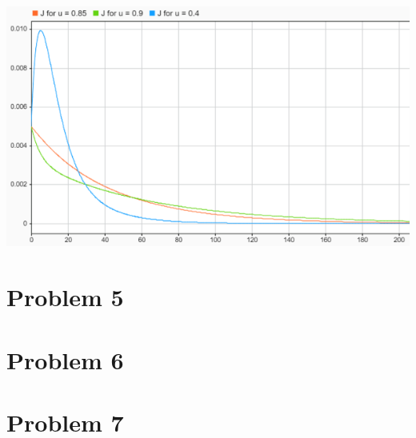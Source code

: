 \documentclass[fleqn]{article}
\begin{document}
\begin{center}
    \includegraphics[width=\linewidth]{comparison_of_u_values_simulink}
\end{center}

\newpage

\section*{Problem 5}

\section*{Problem 6}

\section*{Problem 7}
\end{document}
